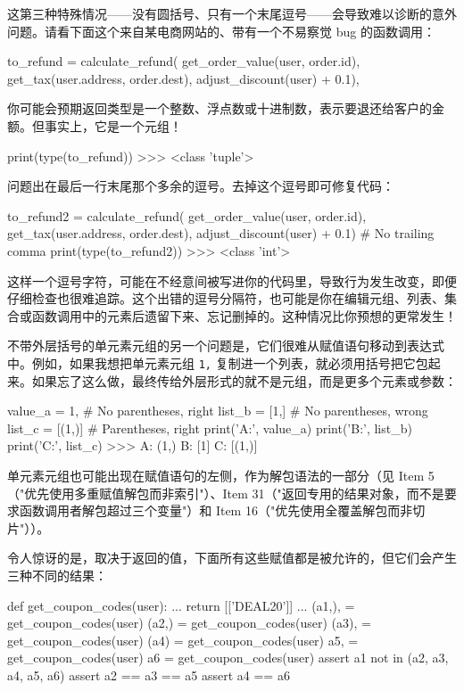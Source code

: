 这第三种特殊情况——没有圆括号、只有一个末尾逗号——会导致难以诊断的意外问题。请看下面这个来自某电商网站的、带有一个不易察觉 bug 的函数调用：

\begin{codebox}[python]
to_refund = calculate_refund(
    get_order_value(user, order.id),
    get_tax(user.address, order.dest),
    adjust_discount(user) + 0.1),
\end{codebox}

你可能会预期返回类型是一个整数、浮点数或十进制数，表示要退还给客户的金额。但事实上，它是一个元组！

\begin{codebox}[python]
print(type(to_refund))
>>>
<class 'tuple'>
\end{codebox}

问题出在最后一行末尾那个多余的逗号。去掉这个逗号即可修复代码：

\begin{codebox}[python]
to_refund2 = calculate_refund(
    get_order_value(user, order.id),
    get_tax(user.address, order.dest),
    adjust_discount(user) + 0.1)  # No trailing comma
print(type(to_refund2))
>>>
<class 'int'>
\end{codebox}

这样一个逗号字符，可能在不经意间被写进你的代码里，导致行为发生改变，即便仔细检查也很难追踪。这个出错的逗号分隔符，也可能是你在编辑元组、列表、集合或函数调用中的元素后遗留下来、忘记删掉的。这种情况比你预想的更常发生！

不带外层括号的单元素元组的另一个问题是，它们很难从赋值语句移动到表达式中。例如，如果我想把单元素元组 \texttt{1,} 复制进一个列表，就必须用括号把它包起来。如果忘了这么做，最终传给外层形式的就不是元组，而是更多个元素或参数：

\begin{codebox}[python]
value_a = 1,    # No parentheses, right
list_b = [1,]   # No parentheses, wrong
list_c = [(1,)] # Parentheses, right
print('A:', value_a)
print('B:', list_b)
print('C:', list_c)
>>>
A: (1,)
B: [1]
C: [(1,)]
\end{codebox}

单元素元组也可能出现在赋值语句的左侧，作为解包语法的一部分（见 Item 5（"优先使用多重赋值解包而非索引"）、Item 31（"返回专用的结果对象，而不是要求函数调用者解包超过三个变量"）和 Item 16（"优先使用全覆盖解包而非切片"））。

令人惊讶的是，取决于返回的值，下面所有这些赋值都是被允许的，但它们会产生三种不同的结果：

\begin{codebox}[python]
def get_coupon_codes(user):
    ...
    return [['DEAL20']]
    ...
(a1,), = get_coupon_codes(user)
(a2,) = get_coupon_codes(user)
(a3), = get_coupon_codes(user)
(a4) = get_coupon_codes(user)
a5, = get_coupon_codes(user)
a6 = get_coupon_codes(user)
assert a1 not in (a2, a3, a4, a5, a6)
assert a2 == a3 == a5
assert a4 == a6
\end{codebox}

